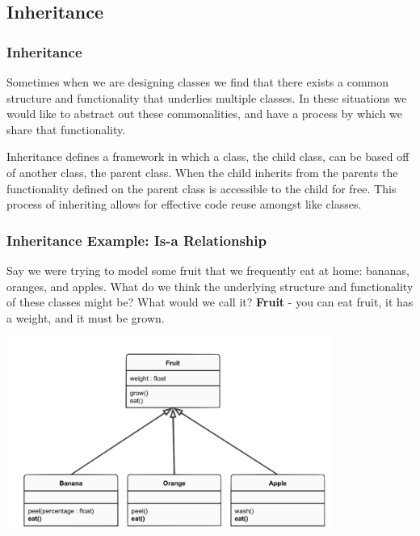 \documentclass{beamer}
\begin{document}
\subsection{Inheritance}
\begin{frame}
  \frametitle{Inheritance}
  Sometimes when we are designing classes we find that there exists a common structure and functionality that underlies multiple classes. In these situations we would like to abstract out these commonalities, and have a process by which we share that functionality. \vspace{4mm}
  \pause

  Inheritance defines a framework in which a class, the child class, can be based off of another class, the parent class. When the child inherits from the parents the functionality defined on the parent class is accessible to the child for free. This process of inheriting allows for effective code reuse amongst like classes.
\end{frame}

\begin{frame}
  \frametitle{Inheritance Example: Is-a Relationship}
  Say we were trying to model some fruit that we frequently eat at home: bananas, oranges, and apples. What do we think the underlying structure and functionality of these classes might be? What would we call it? \pause \textbf{Fruit} - you can eat fruit, it has a weight, and it must be grown. \vspace{2mm}
  \pause
  \begin{center}
    \includegraphics[width=0.8\textwidth]{images/inheritance.png}
  \end{center}
\end{frame}
\end{document}
